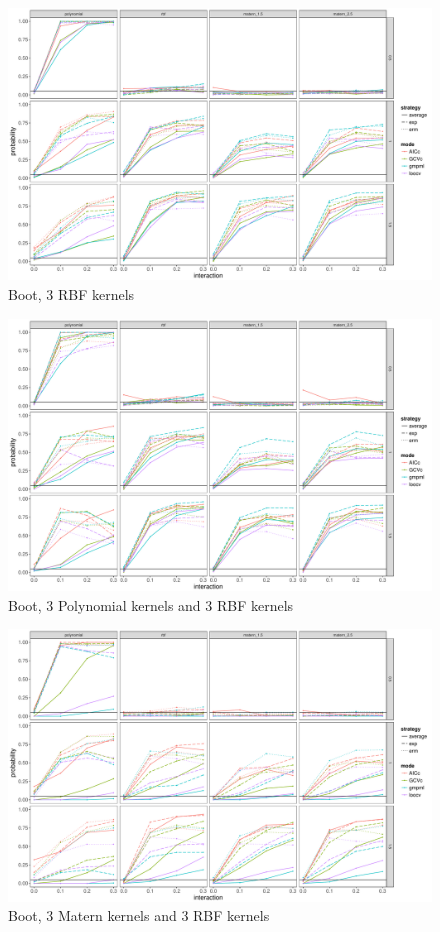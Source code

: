 \documentclass[article]{jss}
\begin{document}
\begin{figure}
\begin{center}
\includegraphics[width=0.9\columnwidth]{B3} 
\caption{Boot, 3 RBF kernels}
\label{fig:res}
\end{center}
\end{figure}

\begin{figure}
\begin{center}
\includegraphics[width=0.9\columnwidth]{B4} 
\caption{Boot, 3 Polynomial kernels and 3 RBF kernels}
\label{fig:res}
\end{center}
\end{figure}

\begin{figure}
\begin{center}
\includegraphics[width=0.9\columnwidth]{B5} 
\caption{Boot, 3 Matern kernels and 3 RBF kernels}
\label{fig:res}
\end{center}
\end{figure}
\end{document}
